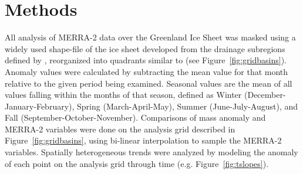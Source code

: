 \documentclass[11pt]{report}
\begin{document}
 \section{Methods}
 
All analysis of MERRA-2 data over the Greenland Ice Sheet was masked using a widely used shape-file of the ice sheet developed from the drainage subregions defined by \cite{zwally2012}, reorganized into quadrants similar to \cite{mcmillan2016} (see Figure~\ref{fig:gridbasins}). Anomaly values were calculated by subtracting the mean value for that month relative to the given period being examined. Seasonal values are the mean of all values falling within the months of that season, defined as Winter (December-January-February), Spring (March-April-May), Summer (June-July-August), and Fall (September-October-November). Comparisons of mass anomaly and MERRA-2 variables were done on the analysis grid described in Figure~\ref{fig:gridbasins}, using bi-linear interpolation to sample the MERRA-2 variables. Spatially heterogeneous trends were analyzed by modeling the anomaly of each point on the analysis grid through time (e.g. Figure~\ref{fig:tslopes}). 
\end{document}
